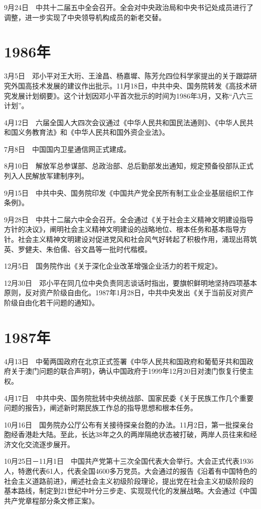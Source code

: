 \documentclass[10pt,a4paper,twocolumn]{book}
\begin{document}
9月24日　中共十二届五中全会召开。全会对中央政治局和中央书记处成员进行了调整，进一步实现了中央领导机构成员的新老交替。

\section{1986年}

3月5日　邓小平对王大珩、王淦昌、杨嘉墀、陈芳允四位科学家提出的关于跟踪研究外国高技术发展的建议作出批示。11月18日，中共中央、国务院转发《高技术研究发展计划纲要》。这个计划因邓小平首次批示的时间为1986年3月，又称“八六三计划”。

4月12日　六届全国人大四次会议通过《中华人民共和国民法通则》、《中华人民共和国义务教育法》和《中华人民共和国外资企业法》。

7月8日　中国国内卫星通信网正式建成。

8月10日　解放军总参谋部、总政治部、总后勤部发出通知，规定预备役部队正式列入人民解放军建制序列。

9月15日　中共中央、国务院印发《中国共产党全民所有制工业企业基层组织工作条例》。

9月28日　中共十二届六中全会召开。全会通过《关于社会主义精神文明建设指导方针的决议》，阐明社会主义精神文明建设的战略地位、根本任务和基本指导方针。社会主义精神文明建设对促进党风和社会风气好转起了积极作用，涌现出蒋筑英、罗健夫、朱伯儒、谷文昌等一批时代楷模。

12月5日　国务院作出《关于深化企业改革增强企业活力的若干规定》。

12月30日　邓小平在同几位中央负责同志谈话时指出，要旗帜鲜明地坚持四项基本原则，反对资产阶级自由化。1987年1月28日，中共中央发出《关于当前反对资产阶级自由化若干问题的通知》。

\section{1987年}

4月13日　中葡两国政府在北京正式签署《中华人民共和国政府和葡萄牙共和国政府关于澳门问题的联合声明》，确认中国政府于1999年12月20日对澳门恢复行使主权。

4月17日　中共中央、国务院批转中央统战部、国家民委《关于民族工作几个重要问题的报告》，阐述新时期民族工作总的指导思想和根本任务。

10月16日　国务院办公厅公布有关接待探亲台胞的办法。11月2日，第一批探亲台胞经香港赴大陆。至此，长达38年之久的两岸隔绝状态被打破，两岸人员往来和经济文化交流逐步展开。

10月25日－11月1日　中国共产党第十三次全国代表大会举行。大会正式代表1936人，特邀代表61人，代表全国4600多万党员。大会通过的报告《沿着有中国特色的社会主义道路前进》，阐述社会主义初级阶段理论，提出党在社会主义初级阶段的基本路线，制定到21世纪中叶分三步走、实现现代化的发展战略。大会通过《中国共产党章程部分条文修正案》。
\end{document}
